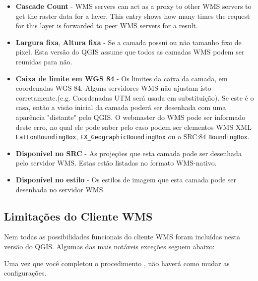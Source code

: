 \begin{itemize}
\begin{itemize}
\item \textbf{Cascade Count}    - WMS servers can act as a proxy to other WMS servers to get
                                  the raster data for a layer.  This entry shows how
                                  many times the request for this layer is forwarded to peer
                                  WMS servers for a result.

\item \textbf{Largura fixa}, \textbf{Altura fixa}
                              - Se a camada possui ou não tamanho fixo de pixel. Esta versão do QGIS assume que todos as camadas WMS podem ser reunidas para não.
                                
\item \textbf{Caixa de limite em WGS 84} - Os limites da caixa da camada, em coordenadas WGS 84. Alguns servidores WMS não ajustam isto corretamente.(e.g. Coordenadas UTM será usada em substituição).  Se este é o casa, então a visão inicial da camada poderá ser desenhada com uma aparência "distante" pelo QGIS. O webmaster do WMS pode ser informado deste erro, no qual ele pode saber pelo caso podem ser  elementos WMS XML \texttt{LatLonBoundingBox}, \texttt{EX\_GeographicBoundingBox} ou o SRC:84 \texttt{BoundingBox}.

\item \textbf{Disponível no SRC} - As projeções que esta camada pode ser desenhada pelo servidor WMS. Estas estão listadas no formato WMS-nativo.

\item \textbf{Disponível no estilo} - Os estilos de imagem que esta camada pode ser desenhada no servidor WMS.

\end{itemize}

\end{itemize}


\subsection{Limitações do Cliente WMS}\label{sec:ogc-wms-limits}

Nem todas as possibilidades funcionais do cliente WMS foram incluídas nesta versão do QGIS. Algumas das mais notáveis exceções seguem abaixo:


Uma vez que você completou o procedimento , não haverá como mudar as configurações.

